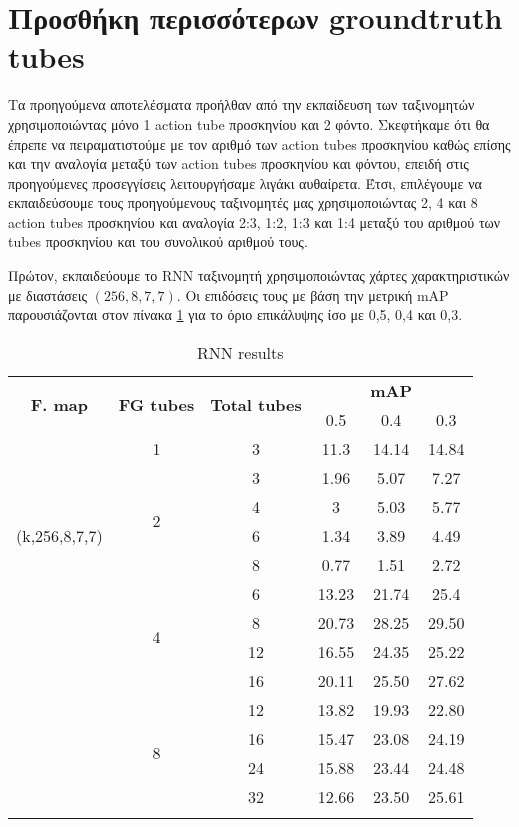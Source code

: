 \section{Προσθήκη περισσότερων \en groundtruth tubes\gr}

Τα προηγούμενα αποτελέσματα προήλθαν από την εκπαίδευση των ταξινομητών χρησιμοποιώντας μόνο 1
\en action tube \gr προσκηνίου και 2 φόντο. Σκεφτήκαμε ότι θα έπρεπε να πειραματιστούμε 
με τον αριθμό των \en action tubes \gr προσκηνίου καθώς επίσης και  την αναλογία μεταξύ 
των \en action tubes \gr προσκηνίου και φόντου, επειδή στις προηγούμενες προσεγγίσεις
λειτουργήσαμε λιγάκι αυθαίρετα. Έτσι, επιλέγουμε να εκπαιδεύσουμε τους προηγούμενους ταξινομητές  μας χρησιμοποιώντας 2,
4 και 8 \en action tubes \gr προσκηνίου και αναλογία 2:3, 1:2, 1:3 και 1:4 μεταξύ του αριθμού
των \en tubes \gr προσκηνίου και του συνολικού αριθμού τους. \par
Πρώτον, εκπαιδεύουμε το \en RNN \gr ταξινομητή χρησιμοποιώντας χάρτες χαρακτηριστικών με διαστάσεις
$(256, 8, 7, 7)$. Οι επιδόσεις τους με βάση την μετρική \en mAP \gr παρουσιάζονται στον πίνακα \ref{table:gr_rnn_increased}
για το όριο επικάλυψης ίσο με 0,5, 0,4 και 0,3.
\begin{center}
  \en
  \begin{longtable}{|| c | c | c || c c c||}
    \hline
    \multirow{2}{*}{\textbf{F. map}} & \multirow{2}{*}{\textbf{FG tubes}}  & \multirow{2}{*}{\textbf{Total tubes}} & {} & \textbf{mAP} & {} \\
    {}  & {} & {} & 0.5 & 0.4 & 0.3 \\
    \hline
    \multirow{7}{*}{(k,256,8,7,7)} & 1 & 3 & 11.3 & 14.14 & 14.84 \\
    \cline{2-6}
    {} & \multirow{4}{*}{2} & 3 & 1.96 & 5.07 & 7.27 \\
    \cline{3-6}
    {} & {} & 4  & 3 & 5.03 & 5.77 \\
    \cline{3-6}
    {} & {} & 6 & 1.34 & 3.89 & 4.49 \\
    \cline{3-6}
    {} & {} & 8 & 0.77 & 1.51 & 2.72 \\
    \cline{2-6}
    {} & \multirow{4}{*}{4} &  6 & 13.23 & 21.74 & 25.4 \\
    \cline{3-6}
    {} & {} & 8 & 20.73 & 28.25 & 29.50 \\
    \cline{3-6}
    {} & {} & 12  & 16.55 & 24.35 & 25.22 \\
    \cline{3-6}
    {} & {} & 16  & 20.11 & 25.50 & 27.62 \\
    \cline{2-6}
    {} & \multirow{4}{*}{8} & 12 & 13.82 & 19.93 & 22.80 \\
    \cline{3-6}
    {} &  {} & 16 & 15.47 & 23.08 & 24.19 \\
    \cline{3-6}
    {} &  {} & 24 & 15.88 & 23.44 & 24.48  \\
    \cline{3-6}
    {} &  {} & 32 &  12.66 & 23.50 & 25.61 \\
    \hline

  \caption{RNN results }
  \label{table:gr_rnn_increased}
\end{longtable}
\end{center}

